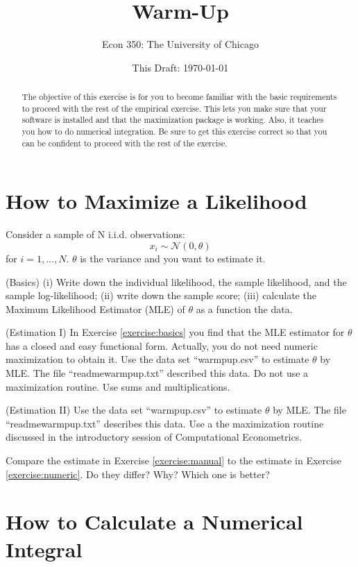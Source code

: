 



\title{Warm-Up}
\author{Econ 350: The University of Chicago}
\date{This Draft: \today}
\maketitle

\begin{abstract}
\noindent The objective of this exercise is for you to become familiar with the basic requirements to proceed with the rest of the empirical exercise. This lets you make sure that your software is installed and that the maximization package is working. Also, it teaches you how to do numerical integration. Be sure to get this exercise correct so that you can be confident to proceed with the rest of the exercise. 
\end{abstract}

\section{How to Maximize a Likelihood}
Consider a sample of N i.i.d. observations:
\begin{equation}
x_{i} \sim \mathcal{N}(0,\theta)
\end{equation}
\noindent for $i = 1, \ldots, N$. $\theta$ is the variance and you want to estimate it. 

\begin{exercise} (Basics) \label{exercise:basics}
(i) Write down the individual likelihood, the sample likelihood, and the sample log-likelihood; (ii) write down the sample score; (iii) calculate the Maximum Likelihood Estimator (MLE) of $\theta$ as a function the data.
\end{exercise}

\begin{exercise} (Estimation I) \label{exercise:manual}
In Exercise \ref{exercise:basics} you find that the MLE estimator for $\theta$ has a closed and easy functional form. Actually, you do not need numeric maximization to obtain it. Use the data set ``warmpup.csv'' to estimate $\theta$ by MLE. The file ``readmewarmpup.txt'' described this data. Do not use a maximization routine. Use sums and multiplications. 
\end{exercise}

\begin{exercise} (Estimation II) \label{exercise:numeric}
Use the data set ``warmpup.csv'' to estimate $\theta$ by MLE. The file ``readmewarmpup.txt'' describes this data. Use a the maximization routine discussed in the introductory session of Computational Econometrics.
\end{exercise}

\begin{exercise} 
Compare the estimate in Exercise \ref{exercise:manual} to the estimate in Exercise \ref{exercise:numeric}. Do they differ? Why? Which one is better?
\end{exercise}

\section{How to Calculate a Numerical Integral}










